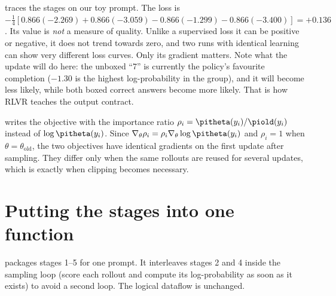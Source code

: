  traces the stages on our toy prompt. The loss is
$-\tfrac14[0.866(-2.269)+0.866(-3.059)-0.866(-1.299)-0.866(-3.400)]=+0.136$. Its value is
\emph{not} a measure of quality. Unlike a supervised loss it can be positive or negative,
it does not trend towards zero, and two runs with identical learning can show very
different loss curves. Only its gradient matters. Note what the update will do here: the
unboxed ``7'' is currently the policy's favourite completion ($-1.30$ is the highest
log-probability in the group), and it will become less likely, while both boxed correct
answers become more likely. That is how RLVR teaches the output contract.

\begin{deepdive}
 writes the objective with the importance ratio
$\rho_i=\pitheta(y_i)/\piold(y_i)$ instead of $\log\pitheta(y_i)$. Since
$\nabla_\theta\rho_i=\rho_i\nabla_\theta\log\pitheta(y_i)$ and $\rho_i=1$ when
$\theta=\theta_{\text{old}}$, the two objectives have identical gradients on the first
update after sampling. They differ only when the same rollouts are reused for several
updates, which is exactly when clipping becomes necessary.
\end{deepdive}

\section{Putting the stages into one function}\label{sec:grpo:onefn}

 packages stages 1--5 for one prompt. It interleaves stages 2 and 4
inside the sampling loop (score each rollout and compute its log-probability as soon as it
exists) to avoid a second loop. The logical dataflow is unchanged.

